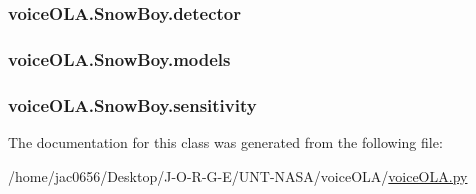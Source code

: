 \subsubsection[{\texorpdfstring{detector}{detector}}]{\setlength{\rightskip}{0pt plus 5cm}voice\+O\+L\+A.\+Snow\+Boy.\+detector}\hypertarget{classvoiceOLA_1_1SnowBoy_a5be49a0ae11c7b41494cf42ecf26e88b}{}\label{classvoiceOLA_1_1SnowBoy_a5be49a0ae11c7b41494cf42ecf26e88b}
\subsubsection[{\texorpdfstring{models}{models}}]{\setlength{\rightskip}{0pt plus 5cm}voice\+O\+L\+A.\+Snow\+Boy.\+models}\hypertarget{classvoiceOLA_1_1SnowBoy_aaa4dad2978716142ba8097884afcc517}{}\label{classvoiceOLA_1_1SnowBoy_aaa4dad2978716142ba8097884afcc517}
\subsubsection[{\texorpdfstring{sensitivity}{sensitivity}}]{\setlength{\rightskip}{0pt plus 5cm}voice\+O\+L\+A.\+Snow\+Boy.\+sensitivity}\hypertarget{classvoiceOLA_1_1SnowBoy_af19c996792bb8af65dc007390d59c459}{}\label{classvoiceOLA_1_1SnowBoy_af19c996792bb8af65dc007390d59c459}


The documentation for this class was generated from the following file\+:\begin{DoxyCompactItemize}
\item 
/home/jac0656/\+Desktop/\+J-\/\+O-\/\+R-\/\+G-\/\+E/\+U\+N\+T-\/\+N\+A\+S\+A/voice\+O\+L\+A/\hyperlink{voiceOLA_2voiceOLA_8py}{voice\+O\+L\+A.\+py}\end{DoxyCompactItemize}

